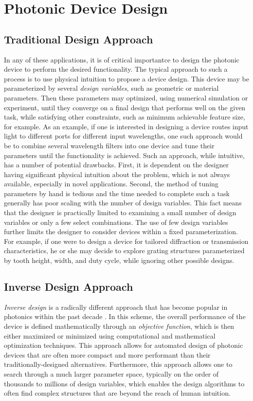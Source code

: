 \section{Photonic Device Design}

\subsection{Traditional Design Approach}

In any of these applications, it is of critical importantce to design the photonic device to perform the desired functionality.
The typical approach to such a process is to use physical intuition to propose a device design.
This device may be parameterized by several \textit{design variables}, such as geometric or material parameters.
Then these parameters may optimized, using numerical simulation or experiment, until they converge on a final design that performs well on the given task, while satisfying other constraints, such as minimum achievable feature size, for example.
As an example, if one is interested in designing a device routes input light to different ports for different input wavelengths, one such approach would be to combine several wavelength filters into one device and tune their parameters until the functionality is achieved.
Such an approach, while intuitive, has a number of potential drawbacks.
First, it is dependent on the designer having significant physical intuition about the problem, which is not always available, especially in novel applications.
Second, the method of tuning parameters by hand is tedious and the time needed to complete such a task generally has poor scaling with the number of design variables.
This fact means that the designer is practically limited to examining a small number of design variables or only a few select combinations.
The use of few design variables further limits the designer to consider devices within a fixed parameterization.
For example, if one were to design a device for tailored diffraction or transmission characteristics, he or she may decide to explore grating structures parameterized by tooth height, width, and duty cycle, while ignoring other possible designs.

\subsection{Inverse Design Approach}

\textit{Inverse design} is a radically different approach that has become popular in photonics within the past decade \cite{molesky_inverse_2018}.  
In this scheme, the overall performance of the device is defined mathematically through an \textit{objective function}, which is then either maximized or minimized using computational and mathematical optimization techniques.
This approach allows for automated design of photonic devices that are often more compact and more performant than their traditionally-designed alternatives.
Furthermore, this approach allows one to search through a much larger parameter space, typically on the order of thousands to millions of design variables, which enables the design algorithms to often find complex structures that are beyond the reach of human intuition.

